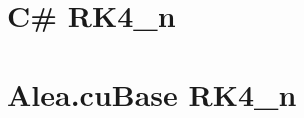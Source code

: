  
  
  \section{C\# RK4\_n}\label{app:csharp_rk4_n}
  
  \section{Alea.cuBase RK4\_n}\label{app:cubase_rk4_n}
  
